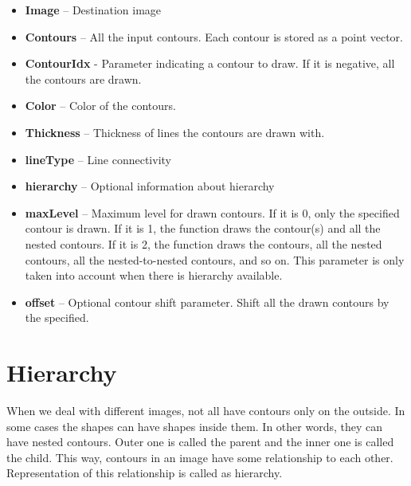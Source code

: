 \documentclass[]{article}
\providecommand{\tightlist}{%
  \setlength{\itemsep}{0pt}\setlength{\parskip}{0pt}}
\begin{document}
\begin{itemize}
\tightlist
\item
  \textbf{Image} -- Destination image\\
\item
  \textbf{Contours} -- All the input contours. Each contour is stored as
  a point vector.\\
\item
  \textbf{ContourIdx} - Parameter indicating a contour to draw. If it is
  negative, all the contours are drawn.\\
\item
  \textbf{Color} -- Color of the contours.\\
\item
  \textbf{Thickness} -- Thickness of lines the contours are drawn
  with.\\
\item
  \textbf{lineType} -- Line connectivity\\
\item
  \textbf{hierarchy} -- Optional information about hierarchy\\
\item
  \textbf{maxLevel} -- Maximum level for drawn contours. If it is 0,
  only the specified contour is drawn. If it is 1, the function draws
  the contour(s) and all the nested contours. If it is 2, the function
  draws the contours, all the nested contours, all the nested-to-nested
  contours, and so on. This parameter is only taken into account when
  there is hierarchy available.\\
\item
  \textbf{offset} -- Optional contour shift parameter. Shift all the
  drawn contours by the specified.
\end{itemize}

\section{Hierarchy}\label{hierarchy}

When we deal with different images, not all have contours only on the
outside. In some cases the shapes can have shapes inside them. In other
words, they can have nested contours. Outer one is called the parent and
the inner one is called the child. This way, contours in an image have
some relationship to each other. Representation of this relationship is
called as hierarchy.
\end{document}
